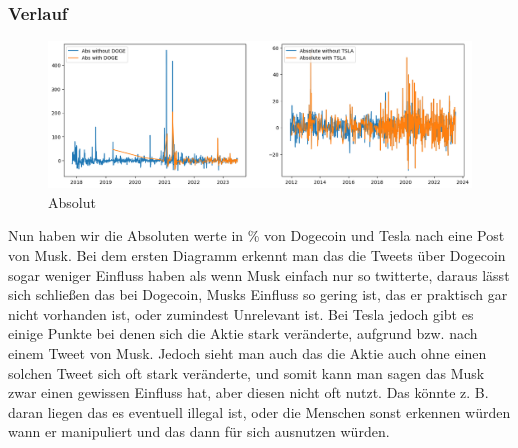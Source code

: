 \documentclass{article}
\begin{document}
\subsubsection{Verlauf}
\begin{figure}[!htb]
  	\includegraphics[width=\textwidth, center]{../imgs/Absolut.png}
 	\caption{Absolut}
 	\label{fig:Absolut}
\end{figure}
Nun haben wir die Absoluten werte in \% von Dogecoin und Tesla nach eine Post von Musk. Bei dem ersten Diagramm erkennt man das die Tweets über Dogecoin sogar weniger Einfluss haben als wenn Musk einfach nur so twitterte, daraus lässt sich schließen das bei Dogecoin, Musks Einfluss so gering ist, das er praktisch gar nicht vorhanden ist, oder zumindest Unrelevant ist. Bei Tesla jedoch gibt es einige Punkte bei denen sich die Aktie stark veränderte, aufgrund bzw. nach einem Tweet von Musk. Jedoch sieht man auch das die Aktie auch ohne einen solchen Tweet sich oft stark veränderte, und somit kann man sagen das Musk zwar einen gewissen Einfluss hat, aber diesen nicht oft nutzt. Das könnte z. B. daran liegen das es eventuell illegal ist, oder die Menschen sonst erkennen würden wann er manipuliert und das dann für sich ausnutzen würden.
\end{document}
